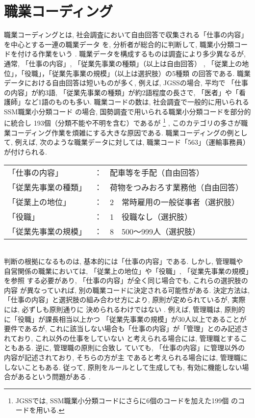 \documentclass{nlp}
\begin{document}
\section{職業コーディング}
\label{coding}
職業コーディングとは, 
社会調査において自由回答で収集される「仕事の内容」を中心とする一連の職業データ
を, 分析者が総合的に判断して, 職業小分類コードを付ける作業をいう
\cite{95SSM95}. 
職業データを構成するものは調査により多少異なるが, 通常, 
「仕事の内容」, 「従業先事業の種類」（以上は自由回答）
, 
「従業上の地位」，「役職」，「従業先事業の規模」（以上は選択肢）の5種類
の回答である. 
職業データにおける自由回答は短いものが多く, 
例えば, JGSSの場合, 平均で
「仕事の内容」が約3語, 「従業先事業の種類」が約2語程度の長さで, 
「医者」や「看護師」など1語のものも多い. 
職業コードの数は, 社会調査で一般的に用いられるSSM職業小分類コード
の場合, 
国勢調査で用いられる職業小分類コードを部分的に統合し
193個（分類不能や不明を含む）であるが
\footnote{JGSSでは, SSM職業小分類コードにさらに6個のコードを加えた199個
のコードを用いる. }
, 
このカテゴリの多さが職業コーディング作業を煩雑にする大きな原因である. 
職業コーディングの例として, 
例えば, 次のような職業データに対しては, 
職業コード「563」（運輸事務員）が付けられる. 
\vspace{2mm}\\
\begin{tabular}{lll}
「仕事の内容」&：&配車等を手配（自由回答）\\
「従業先事業の種類」&：&荷物をつみおろす業務他（自由回答）\\  
「従業上の地位」&：&2　常時雇用の一般従事者（選択肢）\\
「役職」&：&1　役職なし（選択肢）\\
「従業先事業の規模」&：&8　500〜999人（選択肢）
\end{tabular}
\vspace{2mm}\\

判断の根拠になるものは, 基本的には「仕事の内容」である. しかし, 管理職や
自営関係の職業においては, 「従業上の地位」や「役職」, 「従業先事業の規模」を参照
する必要があり, 「仕事の内容」が全く同じ場合でも, これらの選択肢の内容
が異なっていれば, 別の職業コードに決定される可能性がある. 
決定方法は, 「仕事の内容」と選択肢の組み合わせ方により, 
原則が定められているが\cite{95SSM96}, 実際には, 必ずしも原則通りに
決められるわけではない
. 
例えば, 管理職は, 原則的に「役職」が課長相当以上かつ
「従業先事業の規模」が30人以上であることが要件であるが, 
これに該当しない場合も「仕事の内容」が「管理」とのみ記述されており, 
これ以外の仕事をしていない
と考えられる場合には, 管理職とすることもある. 逆に, 管理職の原則に合致し
ていても, 「仕事の内容」に管理以外の内容が記述されており, そちらの方が主
であると考えられる場合には, 管理職にしないこともある. 
従って, 原則をルールとして生成しても, 
有効に機能しない場合があるという問題がある
. 
\end{document}
